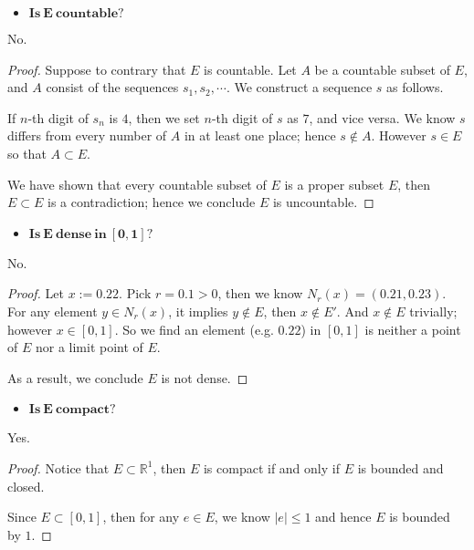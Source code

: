 \begin{Exercise}
\begin{itemize}
\item $\mathbf{Is\ E\ countable?}$
\end{itemize}
\begin{answer}
No.
\end{answer}
\begin{proof}
Suppose to contrary that $E$ is countable. Let $A$ be a countable subset of $E$, and $A$ consist of the sequences $s_1, s_2, \cdots$. We construct a sequence $s$ as follows.

If $n$-th digit of $s_n$ is $4$, then we set $n$-th digit of $s$ as $7$, and vice versa. We know $s$ differs from every number of $A$ in at least one place; hence $s\notin A$. However $s\in E$ so that $A\subset E$.

We have shown that every countable subset of $E$ is a proper subset $E$, then $E\subset E$ is a contradiction; hence we conclude $E$ is uncountable.
\end{proof}

\begin{itemize}
\item $\mathbf{Is\ E\ dense\ in\ [0,1]?}$
\end{itemize}
\begin{answer}
No.
\end{answer}
\begin{proof}
Let $x := 0.22$. Pick $r = 0.1 > 0$, then we know $N_r(x) = (0.21, 0.23)$. For any element $y\in N_r(x)$, it implies $y\notin E$, then $x\notin E'$. And $x\notin E$ trivially; however $x\in [0,1]$. So we find an element (e.g. $0.22$) in $[0,1]$ is neither a point of $E$ nor a limit point of $E$.

As a result, we conclude $E$ is not dense.
\end{proof}

\begin{itemize}
\item $\mathbf{Is\ E\ compact?}$
\end{itemize}
\begin{answer}
Yes.
\end{answer}
\begin{proof}
Notice that $E\subset \mathbb{R}^1$, then $E$ is compact if and only if $E$ is bounded and closed.

Since $E\subset[0,1]$, then for any $e\in E$, we know $|e| \leq 1$ and hence $E$ is bounded by $1$.


\end{proof}
\end{Exercise}
